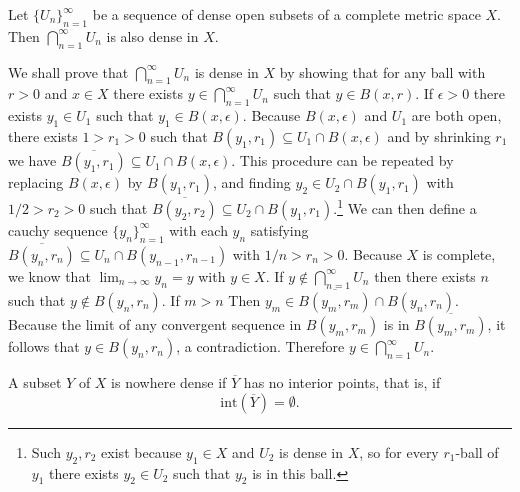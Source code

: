 \documentclass[nobib,notoc]{tufte-handout}
\begin{document}
\begin{thm}
	Let \(\{U_n\}_{n=1}^{\infty}\) be a sequence of dense open subsets of a complete metric space \(X\). Then \(\bigcap_{n=1}^{\infty}U_n\) is also dense in \(X\).
	\begin{IEEEproof}
		We shall prove that \(\bigcap_{n=1}^{\infty}U_n\) is dense in \(X\) by showing that for any ball with \(r>0\) and \(x\in X\)  there exists \(y\in\bigcap_{n=1}^{\infty}U_n\) such that \(y\in B(x,r)\).\bigbreak
		If \(\epsilon>0\) there exists \(y_1\in U_1\) such that \(y_1\in B(x,\epsilon)\). Because \(B(x,\epsilon)\) and \(U_1\) are both open, there exists \(1>r_1>0\) such that \(B(y_1,r_1)\subseteq U_1\cap B(x,\epsilon)\) and by shrinking \(r_1\) we have \(\overline{B(y_1,r_1)}\subseteq U_1\cap B(x,\epsilon)\). This procedure can be repeated by replacing \(B(x,\epsilon)\) by \(B(y_1,r_1)\), and finding \(y_2\in U_2\cap B(y_1,r_1)\) with \(1/2>r_2>0\) such that \(\overline{B(y_2,r_2)}\subseteq U_2\cap B(y_1,r_1)\).\footnote{Such \(y_2,r_2\) exist because \(y_1\in X\) and \(U_2\) is dense in \(X\), so for every \(r_1\)-ball of \(y_1\) there exists \(y_2\in U_2\) such that \(y_2\) is in this ball.}
		We can then define a cauchy sequence \(\{y_n\}_{n=1}^{\infty}\) with each \(y_n\) satisfying \(\overline{B(y_n,r_n)}\subseteq U_{n}\cap B(y_{n-1}, r_{n-1})\) with \(1/n>r_n>0\). Because \(X\) is complete, we know that \(\lim_{n\rightarrow\infty}y_n=y\) with \(y\in X\). If \(y\notin\bigcap_{n=1}^{\infty}U_n\) then there exists \(n\) such that \(y\notin B(y_n,r_n)\). If \(m>n\) Then \(y_m\in \overline{B(y_m,r_m)}\cap B(y_n,r_n)\). Because the limit of any convergent sequence in \(B(y_m,r_m)\) is in \(\overline{B(y_m,r_m)}\), it follows that \(y\in B(y_n,r_n)\), a contradiction. Therefore \(y\in\bigcap_{n=1}^{\infty}U_n\).
	\end{IEEEproof}
\end{thm}
\begin{defi}
	A subset \(Y\) of \(X\) is nowhere dense if \(\overline{Y}\) has no interior points, that is, if
	\begin{equation*}
		\text{int}(\overline{Y})=\emptyset.
	\end{equation*}
\end{defi}
\end{document}
